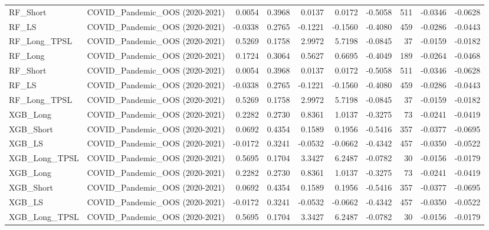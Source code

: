 \begin{tabular}{llrrrrrrrr}
\cline{1-10}
RF\_Short & COVID\_Pandemic\_OOS (2020-2021) & 0.0054 & 0.3968 & 0.0137 & 0.0172 & -0.5058 & 511 & -0.0346 & -0.0628 \\
\cline{1-10}
RF\_LS & COVID\_Pandemic\_OOS (2020-2021) & -0.0338 & 0.2765 & -0.1221 & -0.1560 & -0.4080 & 459 & -0.0286 & -0.0443 \\
\cline{1-10}
RF\_Long\_TPSL & COVID\_Pandemic\_OOS (2020-2021) & 0.5269 & 0.1758 & 2.9972 & 5.7198 & -0.0845 & 37 & -0.0159 & -0.0182 \\
\cline{1-10}
RF\_Long & COVID\_Pandemic\_OOS (2020-2021) & 0.1724 & 0.3064 & 0.5627 & 0.6695 & -0.4049 & 189 & -0.0264 & -0.0468 \\
\cline{1-10}
RF\_Short & COVID\_Pandemic\_OOS (2020-2021) & 0.0054 & 0.3968 & 0.0137 & 0.0172 & -0.5058 & 511 & -0.0346 & -0.0628 \\
\cline{1-10}
RF\_LS & COVID\_Pandemic\_OOS (2020-2021) & -0.0338 & 0.2765 & -0.1221 & -0.1560 & -0.4080 & 459 & -0.0286 & -0.0443 \\
\cline{1-10}
RF\_Long\_TPSL & COVID\_Pandemic\_OOS (2020-2021) & 0.5269 & 0.1758 & 2.9972 & 5.7198 & -0.0845 & 37 & -0.0159 & -0.0182 \\
\cline{1-10}
XGB\_Long & COVID\_Pandemic\_OOS (2020-2021) & 0.2282 & 0.2730 & 0.8361 & 1.0137 & -0.3275 & 73 & -0.0241 & -0.0419 \\
\cline{1-10}
XGB\_Short & COVID\_Pandemic\_OOS (2020-2021) & 0.0692 & 0.4354 & 0.1589 & 0.1956 & -0.5416 & 357 & -0.0377 & -0.0695 \\
\cline{1-10}
XGB\_LS & COVID\_Pandemic\_OOS (2020-2021) & -0.0172 & 0.3241 & -0.0532 & -0.0662 & -0.4342 & 457 & -0.0350 & -0.0522 \\
\cline{1-10}
XGB\_Long\_TPSL & COVID\_Pandemic\_OOS (2020-2021) & 0.5695 & 0.1704 & 3.3427 & 6.2487 & -0.0782 & 30 & -0.0156 & -0.0179 \\
\cline{1-10}
XGB\_Long & COVID\_Pandemic\_OOS (2020-2021) & 0.2282 & 0.2730 & 0.8361 & 1.0137 & -0.3275 & 73 & -0.0241 & -0.0419 \\
\cline{1-10}
XGB\_Short & COVID\_Pandemic\_OOS (2020-2021) & 0.0692 & 0.4354 & 0.1589 & 0.1956 & -0.5416 & 357 & -0.0377 & -0.0695 \\
\cline{1-10}
XGB\_LS & COVID\_Pandemic\_OOS (2020-2021) & -0.0172 & 0.3241 & -0.0532 & -0.0662 & -0.4342 & 457 & -0.0350 & -0.0522 \\
\cline{1-10}
XGB\_Long\_TPSL & COVID\_Pandemic\_OOS (2020-2021) & 0.5695 & 0.1704 & 3.3427 & 6.2487 & -0.0782 & 30 & -0.0156 & -0.0179 \\

\end{tabular}
